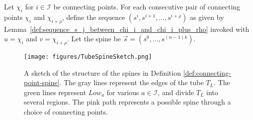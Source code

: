 \documentclass[11pt]{article}
\begin{document}
\begin{definition} \label{def:connecting-point-spine}
Let $\chi_i$ for $i \in \mathcal{I}$ be connecting points. %
For each consecutive pair of connecting points $\chi_i$ and $\chi_{i+ \rho}$, define the sequence  $(s^i, s^{i+1}, \ldots, s^{i+\rho})$ as given by Lemma~\ref{def:sequence_s_j_between_chi_i_and_chi_i_plus_rho} invoked with $u = \chi_i$ and $v = \chi_{i+\rho}$. Let the spine be  $\vec{s} = (s^0, \ldots, s^{(n-1)k})$.
\end{definition}

\begin{figure}[h!]
\centering 
\texttt{[image: figures/TubeSpineSketch.png]}
\caption{A sketch of the structure of the spines in Definition \ref{def:connecting-point-spine}. The gray lines represent the edges of the tube $T_L$. The green lines represent $Low_a$ for various $a \in \mathcal{I}$, and divide $T_L$ into several regions. The pink path represents a possible spine through a choice of connecting points. }
\end{figure}
\end{document}
